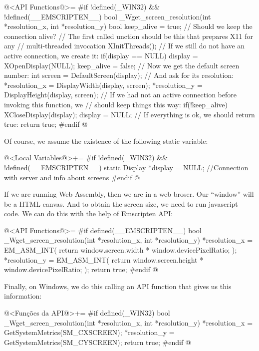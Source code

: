 \iniciocodigo
@<API Functions@>=
#if !defined(_WIN32) && !defined(__EMSCRIPTEN__)
bool _Wget_screen_resolution(int *resolution_x, int *resolution_y){
  bool keep_alive = true; // Should we keep the connection alive?
  // The first called unction should be this that prepares X11 for any
  // multi-threaded invocation
  XInitThreads();
  // If we still do not have an active connection, we create it:
  if(display == NULL){
    display = XOpenDisplay(NULL);
    keep_alive = false;
  }
  // Now we get the default screen number:
  int screen = DefaultScreen(display);
  // And ask for its resolution:
  *resolution_x = DisplayWidth(display, screen);
  *resolution_y = DisplayHeight(display, screen);
  // If we had not an active connection before invoking this function, we
  // should keep things this way:
  if(!keep_alive){
    XCloseDisplay(display);
    display = NULL;
  }
  // If everything is ok, we should return true:
  return true;
}
#endif
@
\fimcodigo

Of course, we assume the existence of the following static variable:

\iniciocodigo
@<Local Variables@>+=
#if !defined(_WIN32) && !defined(__EMSCRIPTEN__)
static Display *display = NULL; //Connection with server and info about screens
#endif
@
\fimcodigo


If we are running Web Assembly, then we are in a web broser. Our
``window'' will be a HTML canvas. And to obtain the screen size, we
need to run javascript code. We can do this with the help of
Emscripten API:

\iniciocodigo
@<API Functions@>=
#if defined(__EMSCRIPTEN__)
bool _Wget_screen_resolution(int *resolution_x, int *resolution_y){
  *resolution_x = EM_ASM_INT({
    return window.screen.width * window.devicePixelRatio;
  });
  *resolution_y = EM_ASM_INT({
    return window.screen.height * window.devicePixelRatio;
  });
  return true;
}
#endif
@
\fimcodigo



Finally, on Windows, we do this calling an API function that gives us
this information:

\iniciocodigo
@<Funções da API@>+=
#if defined(_WIN32)
bool _Wget_screen_resolution(int *resolution_x, int *resolution_y){
  *resolution_x = GetSystemMetrics(SM_CXSCREEN);
  *resolution_y = GetSystemMetrics(SM_CYSCREEN);
  return true;
}
#endif
@
\fimcodigo

